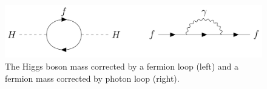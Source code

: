 \begin{figure}[hbtp]
\centering
\includegraphics[scale=0.3]{figures/intro/loop_diagrams.png}
\caption{The Higgs boson mass corrected by a fermion loop (left) and a fermion mass corrected by photon loop (right).}
\label{loop_diagrams}
\end{figure}